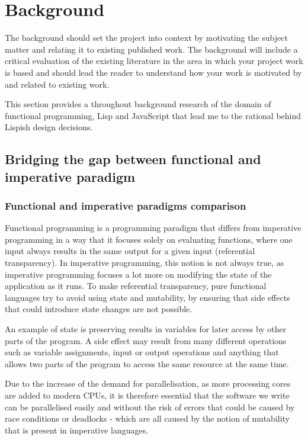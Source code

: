 \chapter{Background}
The background should set the project into context by motivating the subject matter and relating it to existing published work. The background will include a critical evaluation of the existing literature in the area in which your project work is based and should lead the reader to understand how your work is motivated by and related to existing work.

This section provides a throughout background research of the domain of functional programming, Lisp and JavaScript that lead me to the rational behind Lispish design decisions.

\section{Bridging the gap between functional and imperative paradigm}

\subsection{Functional and imperative paradigms comparison}
Functional programming is a programming paradigm that differs from imperative programming in a way that it focuses solely on evaluating functions, where one input always results in the same output for a given input (referential transparency). In imperative programming, this notion is not always true, as imperative programming focuses a lot more on modifying the state of the application as it runs. To make referential transparency, pure functional languages try to avoid using state and mutability, by ensuring that side effects that could introduce state changes are not possible.

An example of state is preserving results in variables for later access by other parts of the program. A side effect may result from many different operations such as variable assignments, input or output operations and anything that allows two parts of the program to access the same resource at the same time.

Due to the increase of the demand for parallelisation, as more processing cores are added to modern CPUs, it is therefore essential that the software we write can be parallelised easily and without the risk of errors that could be caused by race conditions or deadlocks - which are all caused by the notion of mutability that is present in imperative languages.

